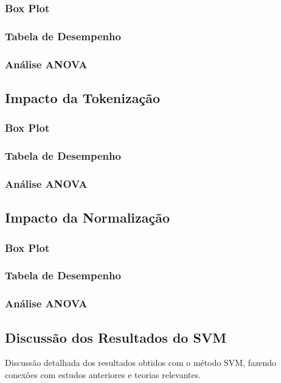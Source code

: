 \subsubsection{Box Plot}
\subsubsection{Tabela de Desempenho}
\subsubsection{Análise ANOVA}

\subsection{Impacto da Tokenização}
\subsubsection{Box Plot}
\subsubsection{Tabela de Desempenho}
\subsubsection{Análise ANOVA}

\subsection{Impacto da Normalização}
\subsubsection{Box Plot}
\subsubsection{Tabela de Desempenho}
\subsubsection{Análise ANOVA}

\subsection{Discussão dos Resultados do SVM}
Discussão detalhada dos resultados obtidos com o método SVM, fazendo conexões com estudos anteriores e teorias relevantes.

